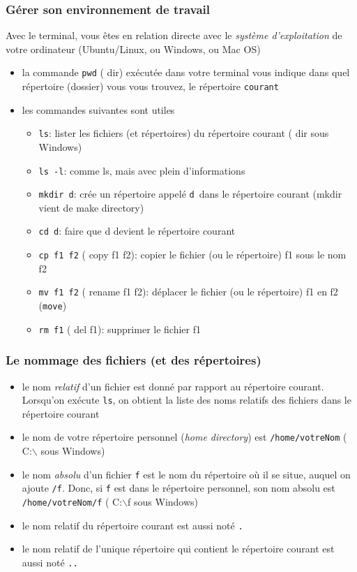 \documentclass{beamer}
\newcommand{\mypause}{\pause}
\newcommand{\prog}[1]{\alert{\texttt{#1}}}
\begin{document}
{
  \frametitle{Gérer son environnement de travail}
 Avec le terminal, vous êtes en relation directe avec le {\em système d'exploitation}
 de votre ordinateur (Ubuntu/Linux, ou Windows, ou Mac OS)\mypause{}
{\footnotesize
  \begin{itemize}
  \item la commande \prog{pwd} ({\color{blue} dir}) exécutée dans votre terminal vous indique dans
  quel répertoire (dossier) vous vous trouvez, le répertoire \prog{courant} \mypause{}
  \item les commandes suivantes sont utiles
  \begin{itemize}
  \item \prog{ls}: lister les fichiers (et répertoires) du répertoire courant  ({\color{blue} dir} sous Windows)\mypause{}
  \item \prog{ls -l}: comme ls, mais avec plein d'informations\mypause{}
  \item \prog{mkdir d}: crée un répertoire appelé \prog{d} dans le répertoire courant (mkdir vient de make directory) \mypause{}
  \item \prog{cd d}: faire que d devient le répertoire courant \mypause{}
  \item \prog{cp f1 f2} ({\color{blue} copy f1 f2}): copier le fichier (ou le répertoire) f1 sous le nom f2 \mypause{}
  \item \prog{mv f1 f2} ({\color{blue} rename f1 f2}): déplacer le fichier (ou le répertoire) f1 en f2 (\prog{move})\mypause{}
  \item \prog{rm f1} ({\color{blue} del f1}): supprimer le fichier f1 
\end{itemize}
  \end{itemize}\mypause{}
}
}

\frame
{
  \frametitle{Le nommage des fichiers (et des répertoires)}
{\footnotesize
  \begin{itemize}
  \item le nom {\em relatif} d'un fichier est donné par rapport au répertoire courant. 
 Lorsqu'on exécute \prog{ls}, on obtient la liste des noms relatifs des fichiers dans 
 le répertoire courant
   \mypause{}
  \item le nom de votre répertoire personnel ({\em home directory}) est \prog{/home/votreNom}
({\color{blue} C:$\backslash$} sous Windows)
\mypause{}
  \item le nom {\em absolu} d'un fichier \prog{f} est le nom du répertoire où il se situe, auquel
  on ajoute \prog{/f}. Donc, si \prog{f} est dans le répertoire personnel, son nom absolu
  est \prog{/home/votreNom/f} ({\color{blue} C:$\backslash$f} sous Windows)\mypause{}
  \item le nom relatif du répertoire courant est aussi noté \prog{.} \mypause
  \item le nom relatif de l'unique répertoire qui contient le répertoire courant est aussi noté \prog{..}
\end{itemize}\mypause{}
}
}
\end{document}

